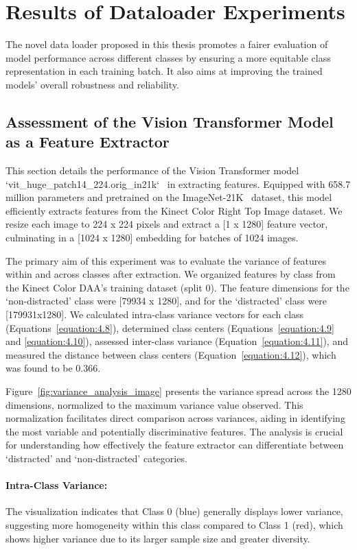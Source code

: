 \section{Results of Dataloader Experiments}
\label{section:dataloader experiments}
The novel data loader proposed in this thesis promotes a fairer evaluation of model performance across different classes by ensuring a more equitable class representation in each training batch. It also aims at improving the trained models' overall robustness and reliability.

\subsection{Assessment of the Vision Transformer Model as a Feature Extractor}
This section details the performance of the Vision Transformer model `vit\_huge\_patch14\_224.orig\_in21k`~\citep{huggingface_vit} in extracting features. Equipped with 658.7 million parameters and pretrained on the ImageNet-21K~\citep{Imagenet_21K_ridnik2021imagenet} dataset, this model efficiently extracts features from the Kinect Color Right Top Image dataset. We resize each image to 224 x 224 pixels and extract a [1 x 1280] feature vector, culminating in a [1024 x 1280] embedding for batches of 1024 images.

The primary aim of this experiment was to evaluate the variance of features within and across classes after extraction. We organized features by class from the Kinect Color DAA's training dataset (split 0). The feature dimensions for the `non-distracted' class were [79934 x 1280], and for the `distracted' class were [179931x1280]. We calculated intra-class variance vectors for each class (Equations~\ref{equation:4.8}), determined class centers (Equations~\ref{equation:4.9} and \ref{equation:4.10}), assessed inter-class variance (Equation~\ref{equation:4.11}), and measured the distance between class centers (Equation~\ref{equation:4.12}), which was found to be 0.366.

Figure~\ref{fig:variance_analysis_image} presents the variance spread across the 1280 dimensions, normalized to the maximum variance value observed. This normalization facilitates direct comparison across variances, aiding in identifying the most variable and potentially discriminative features. The analysis is crucial for understanding how effectively the feature extractor can differentiate between `distracted' and `non-distracted' categories.

\paragraph{Intra-Class Variance:} The visualization indicates that Class 0 (blue) generally displays lower variance, suggesting more homogeneity within this class compared to Class 1 (red), which shows higher variance due to its larger sample size and greater diversity.

